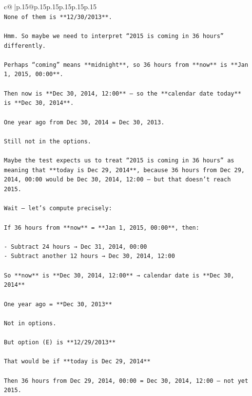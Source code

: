\documentclass{article}
\begin{document}
{\begin{supertabular}{c@{$\;$}|p{.15\linewidth}@{}p{.15\linewidth}p{.15\linewidth}p{.15\linewidth}p{.15\linewidth}p{.15\linewidth}}
{{{\\ 
\texttt{None of them is **12/30/2013**.} \\
\\ 
\texttt{Hmm. So maybe we need to interpret “2015 is coming in 36 hours” differently.} \\
\\ 
\texttt{Perhaps “coming” means **midnight**, so 36 hours from **now** is **Jan 1, 2015, 00:00**.} \\
\\ 
\texttt{Then now is **Dec 30, 2014, 12:00** — so the **calendar date today** is **Dec 30, 2014**.} \\
\\ 
\texttt{One year ago from Dec 30, 2014 = Dec 30, 2013.} \\
\\ 
\texttt{Still not in the options.} \\
\\ 
\texttt{Maybe the test expects us to treat “2015 is coming in 36 hours” as meaning that **today is Dec 29, 2014**, because 36 hours from Dec 29, 2014, 00:00 would be Dec 30, 2014, 12:00 — but that doesn’t reach 2015.} \\
\\ 
\texttt{Wait — let’s compute precisely:} \\
\\ 
\texttt{If 36 hours from **now** = **Jan 1, 2015, 00:00**, then:} \\
\\ 
\texttt{{-} Subtract 24 hours → Dec 31, 2014, 00:00} \\
\texttt{{-} Subtract another 12 hours → Dec 30, 2014, 12:00} \\
\\ 
\texttt{So **now** is **Dec 30, 2014, 12:00** → calendar date is **Dec 30, 2014**} \\
\\ 
\texttt{One year ago = **Dec 30, 2013**} \\
\\ 
\texttt{Not in options.} \\
\\ 
\texttt{But option (E) is **12/29/2013**} \\
\\ 
\texttt{That would be if **today is Dec 29, 2014**} \\
\\ 
\texttt{Then 36 hours from Dec 29, 2014, 00:00 = Dec 30, 2014, 12:00 — not yet 2015.} \\
}}}
\end{supertabular}}
\end{document}
